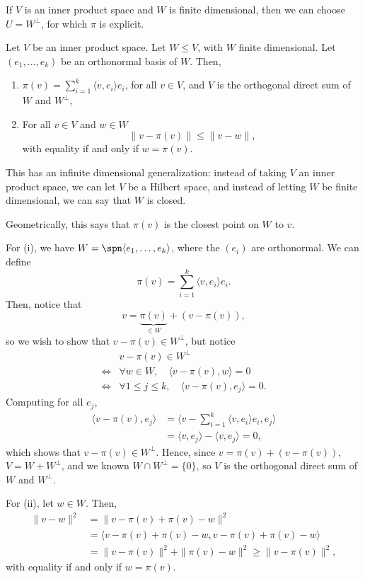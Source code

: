 \documentclass[12pt]{article}
\begin{document}
If $V$ is an inner product space and $W$ is finite dimensional, then we can choose $U = W^{\perp}$, for which $\pi$ is explicit.

\begin{lemma}
	Let $V$ be an inner product space. Let $W \leq V$, with $W$ finite dimensional. Let $(e_1, \ldots, e_k)$ be an orthonormal basis of $W$. Then,
	\begin{enumerate}[\normalfont(i)]
		\item $\pi(v) = \sum_{i = 1}^{k} \langle v, e_i \rangle e_i$, for all $v \in V$, and $V$ is the orthogonal direct sum of $W$ and $W^{\perp}$,
		\item  For all $v \in V$ and $w \in W$ 
			\[
			\|v - \pi(v)\| \leq \|v - w\|
			,\]
			with equality if and only if $w = \pi(v)$.
	\end{enumerate}
\end{lemma}

\begin{remark}
	This has an infinite dimensional generalization: instead of taking $V$ an inner product space, we can let $V$ be a Hilbert space, and instead of letting $W$ be finite dimensional, we can say that $W$ is closed.

	Geometrically, this says that $\pi(v)$ is the closest point on $W$ to $v$.
\end{remark}

\begin{proofbox}
	For (i), we have $W = \spn \langle e_1, \ldots, e_k \rangle$, where the $(e_i)$ are orthonormal. We can define
	\[
	\pi(v) = \sum_{i = 1}^{k}\langle v, e_i \rangle e_i
	.\]
	Then, notice that
	\[
		v = \underbrace{\pi(v)}_{\in W} + (v -  \pi(v))
	,\]
	so we wish to show that $v - \pi(v) \in W^{\perp}$, but notice
	\begin{align*}
		& v - \pi(v) \in W^{\perp} \\
		\iff & \forall w \in W, \quad \langle v - \pi(v), w \rangle = 0 \\
		\iff & \forall 1 \leq j \leq k, \quad \langle v - \pi(v), e_j \rangle = 0.
	\end{align*}
	Computing for all $e_j$,
	\begin{align*}
		\langle v - \pi(v), e_j \rangle &= \biggl \langle v - \sum_{i = 1}^{k} \langle v, e_i \rangle e_i, e_j \biggr\rangle \\
						&= \langle v, e_j \rangle - \langle v, e_j \rangle = 0,
	\end{align*}
	which shows that $v - \pi(v) \in W^{\perp}$. Hence, since $v = \pi(v) + (v - \pi(v))$, $V = W + W^{\perp}$, and we known $W \cap W^{\perp} = \{0\}$, so $V$ is the orthogonal direct sum of $W$ and $W^{\perp}$.

	For (ii), let $w \in W$. Then,
	\begin{align*}
		\|v - w\|^2 &= \|v - \pi(v) + \pi(v) - w\|^2 \\
			    &= \langle v - \pi(v) + \pi(v) - w, v - \pi(v) + \pi(v) - w \rangle \\
			    &= \|v - \pi(v)\|^2 + \|\pi(v) - w\|^2 \geq \|v - \pi(v)\|^2,
	\end{align*}
	with equality if and only if $w = \pi(v)$.
\end{proofbox}
\end{document}
